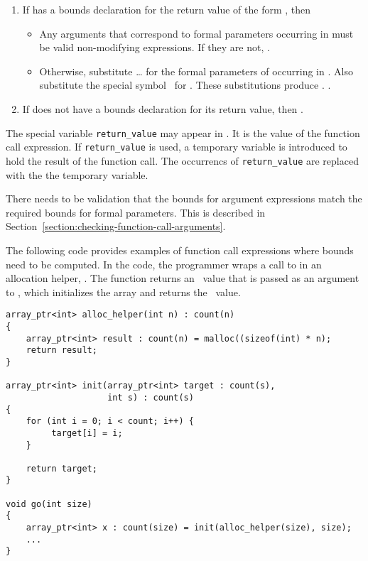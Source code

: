 \begin{enumerate}
\item
  If  has a bounds declaration for the return value of the form
   , then

  \begin{itemize}
  \item
    Any arguments that correspond to formal parameters occurring in
     must be valid non-modifying expressions. If they are
    not, .
  \item
    Otherwise, substitute  \ldots{}  for the formal
    parameters of  occurring in . Also substitute the
    special symbol \exprcurrentvalue\ for
    . These substitutions produce .
    .
  \end{itemize}
\item
  If  does not have a bounds declaration for its return value,
  then .
\end{enumerate}

The special variable \lstinline|return_value| may appear in . It
is the value of the function call expression. If \lstinline|return_value|
is used, a temporary variable is introduced to hold the result of the
function call.  The occurrencs of \lstinline|return_value| are replaced
with the the temporary variable.

There needs to be validation that the bounds for argument expressions
match the required bounds for formal parameters. This is described in
Section~\ref{section:checking-function-call-arguments}.

The following code provides examples of function call expressions where
bounds need to be computed. In the code, the programmer wraps a call to
 in an allocation helper, . The
function  returns an \arrayptr\ value
that is passed as an argument to , which initializes the array
and returns the \arrayptr\ value.
\begin{lstlisting}
array_ptr<int> alloc_helper(int n) : count(n)
{
    array_ptr<int> result : count(n) = malloc((sizeof(int) * n);
    return result;
}

array_ptr<int> init(array_ptr<int> target : count(s), 
                    int s) : count(s)
{
    for (int i = 0; i < count; i++) {
         target[i] = i;
    }

    return target;
}

void go(int size) 
{
    array_ptr<int> x : count(size) = init(alloc_helper(size), size);
    ...
}
\end{lstlisting}

